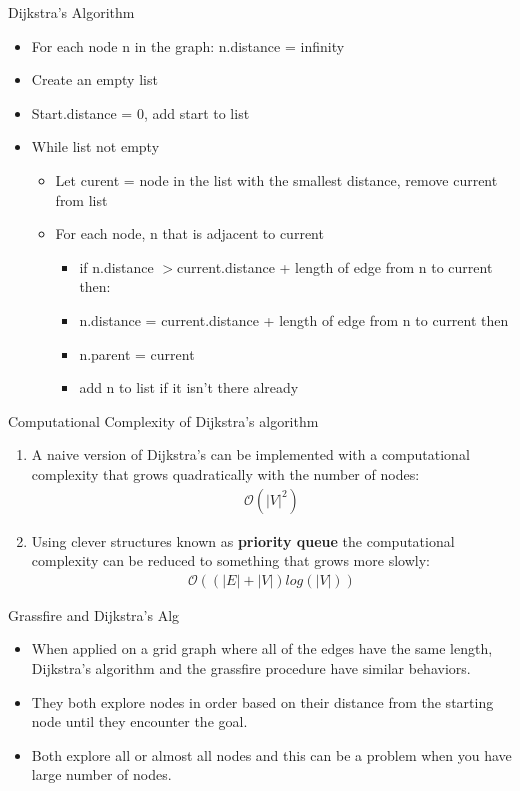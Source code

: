 \documentclass[10pt,mathserif]{beamer}
\begin{document}
\begin{frame}{Dijkstra's Algorithm}
\begin{itemize}
\item For each node n in the graph: n.distance = infinity
\item Create an empty list
\item Start.distance = 0, add start to list
\item While list not empty
\begin{itemize}
\item Let curent = node in the list with the smallest distance, remove current from list
\item For each node, n that is adjacent to current
\begin{itemize}
\item if n.distance $> $current.distance + length of edge from n to current then:
\item n.distance = current.distance + length of edge from n to current then
\item n.parent = current
\item add n to list if it isn't there already
\end{itemize}
\end{itemize}
\end{itemize}
\end{frame}


\begin{frame}{Computational Complexity of Dijkstra's algorithm}
\begin{enumerate}
\item A naive version of Dijkstra's can be implemented with a computational complexity that grows
quadratically with the number of nodes:
\begin{align}
\mathcal{O}(|V|^2)
\end{align}
\item Using clever structures known as \textbf{priority queue} the computational complexity can be reduced to something that grows more slowly:
\begin{align}
\mathcal{O}((|E| + |V|)log(|V|))
\end{align}
\end{enumerate}
\end{frame}

\begin{frame}{Grassfire and Dijkstra's Alg}
\begin{itemize}
\item When applied on a grid graph where all of the edges have the same length, Dijkstra's algorithm and the grassfire procedure have similar behaviors.
\item They both explore nodes in order based on their distance from the starting node until they encounter the goal.
\item Both explore all or almost all nodes and this can be a problem when you have large number of nodes.
\end{itemize}
\end{frame}
\end{document}
